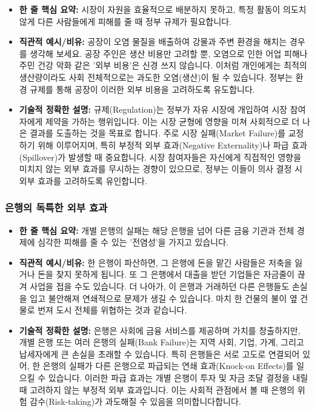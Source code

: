 \documentclass[11pt,a4paper]{book}
\theoremstyle{definition}
\begin{document}
\begin{itemize}
    \item \textbf{한 줄 핵심 요약:} 시장이 자원을 효율적으로 배분하지 못하고, 특정 활동이 의도치 않게 다른 사람들에게 피해를 줄 때 정부 규제가 필요합니다.
    \item \textbf{직관적 예시/비유:} 공장이 오염 물질을 배출하여 강물과 주변 환경을 해치는 경우를 생각해 보세요. 공장 주인은 생산 비용만 고려할 뿐, 오염으로 인한 어업 피해나 주민 건강 악화 같은 '외부 비용'은 신경 쓰지 않습니다. 이처럼 개인에게는 최적의 생산량이라도 사회 전체적으로는 과도한 오염(생산)이 될 수 있습니다. 정부는 환경 규제를 통해 공장이 이러한 외부 비용을 고려하도록 유도합니다.
    \item \textbf{기술적 정확한 설명:} 규제(Regulation)는 정부가 자유 시장에 개입하여 시장 참여자에게 제약을 가하는 행위입니다. 이는 시장 균형에 영향을 미쳐 사회적으로 더 나은 결과를 도출하는 것을 목표로 합니다. 주로 시장 실패(Market Failure)를 교정하기 위해 이루어지며, 특히 부정적 외부 효과(Negative Externality)나 파급 효과(Spillover)가 발생할 때 중요합니다. 시장 참여자들은 자신에게 직접적인 영향을 미치지 않는 외부 효과를 무시하는 경향이 있으므로, 정부는 이들이 의사 결정 시 외부 효과를 고려하도록 유인합니다.
\end{itemize}

\subsubsection{은행의 독특한 외부 효과}

\begin{itemize}
    \item \textbf{한 줄 핵심 요약:} 개별 은행의 실패는 해당 은행을 넘어 다른 금융 기관과 전체 경제에 심각한 피해를 줄 수 있는 '전염성'을 가지고 있습니다.
    \item \textbf{직관적 예시/비유:} 한 은행이 파산하면, 그 은행에 돈을 맡긴 사람들은 저축을 잃거나 돈을 찾지 못하게 됩니다. 또 그 은행에서 대출을 받던 기업들은 자금줄이 끊겨 사업을 접을 수도 있습니다. 더 나아가, 이 은행과 거래하던 다른 은행들도 손실을 입고 불안해져 연쇄적으로 문제가 생길 수 있습니다. 마치 한 건물의 불이 옆 건물로 번져 도시 전체를 위협하는 것과 같습니다.
    \item \textbf{기술적 정확한 설명:} 은행은 사회에 금융 서비스를 제공하며 가치를 창출하지만, 개별 은행 또는 여러 은행의 실패(Bank Failure)는 지역 사회, 기업, 가계, 그리고 납세자에게 큰 손실을 초래할 수 있습니다. 특히 은행들은 서로 고도로 연결되어 있어, 한 은행의 실패가 다른 은행으로 파급되는 연쇄 효과(Knock-on Effects)를 일으킬 수 있습니다. 이러한 파급 효과는 개별 은행이 투자 및 자금 조달 결정을 내릴 때 고려하지 않는 부정적 외부 효과입니다. 이는 사회적 관점에서 볼 때 은행의 위험 감수(Risk-taking)가 과도해질 수 있음을 의미합니다합니다.
\end{itemize}
\end{document}
